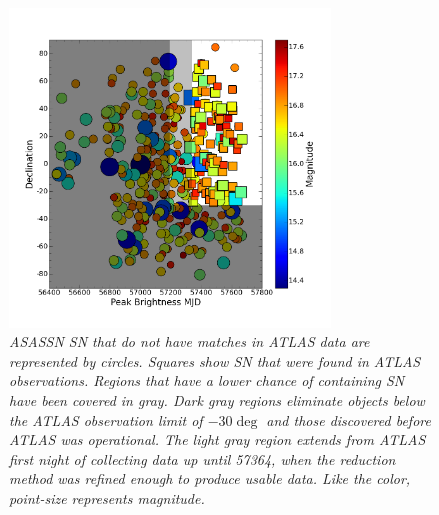 \begin{figure}[H]%
  \begin{center}
\centerline{\includegraphics[width=3.35in]{figures/invert_mag.png}}
\caption{\it \small{ASASSN SN that do not have matches in ATLAS data are represented by circles. Squares show SN that were found in ATLAS observations. Regions that have a lower chance of containing SN have been covered in gray. Dark gray regions eliminate objects below the ATLAS observation limit of $-30\deg$ and those discovered before ATLAS was operational. The light gray region extends from ATLAS first night of collecting data up until 57364, when the reduction method was refined enough to produce usable data. Like the color, point-size represents magnitude.~\label{fig:dec_mjd}}}
  \end{center}
\end{figure}


